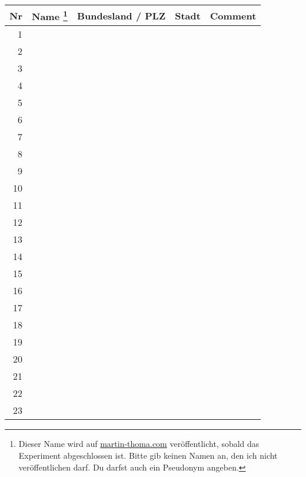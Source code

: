\documentclass[11pt,a4paper,oneside,landscape]{scrartcl}
\begin{document}
\begin{minipage*}{6cm}
\begin{tabular}{r || p{5cm} | p{4cm} | p{5cm} | p{10cm}}
    Nr & Name \footnote{Dieser Name wird auf \href{http://martin-thoma.com}{martin-thoma.com} veröffentlicht, sobald das Experiment abgeschlossen ist. Bitte gib keinen Namen an, den ich nicht veröffentlichen darf. Du darfst auch ein Pseudonym angeben.}   & Bundesland / PLZ & Stadt & Comment\\
    \hline
    \hline
1 & & &\\
\hline
2 & & &\\
\hline
3 & & &\\
\hline
4 & & &\\
\hline
5 & & &\\
\hline
6 & & &\\
\hline
7 & & &\\
\hline
8 & & &\\
\hline
9 & & &\\
\hline
10 & & &\\
\hline
11 & & &\\
\hline
12 & & &\\
\hline
13 & & &\\
\hline
14 & & &\\
\hline
15 & & &\\
\hline
16 & & &\\
\hline
17 & & &\\
\hline
18 & & &\\
\hline
19 & & &\\
\hline
20 & & &\\
\hline
21 & & &\\
\hline
22 & & &\\
\hline
23 & & &\\
\hline
\end{tabular}
\end{minipage*}
\end{document}
